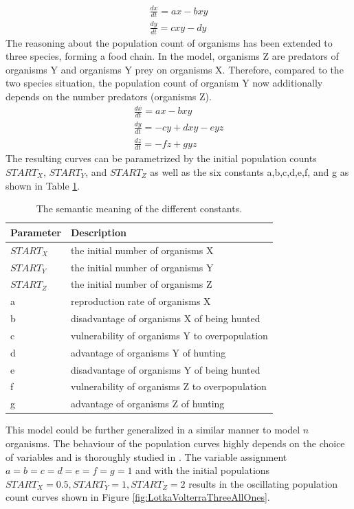 \documentclass[11pt]{article}
\begin{document}
\begin{equation}
\begin{split}
\frac{dx}{dt} = ax-bxy \\ 
\frac{dy}{dt} = cxy-dy
\end{split}
\end{equation}
The reasoning about the population count of organisms has been extended to three species, \cite{lotkaVolterraThreeSpecies} forming a food chain. In the model, organisms Z are predators of organisms Y and organisms Y prey on organisms X. Therefore, compared to the two species situation, the population count of organism Y now additionally depends on the number predators (organisms Z).
\begin{equation}
\begin{split}
\frac{dx}{dt} = ax-bxy \\ 
\frac{dy}{dt} = -cy+dxy-eyz \\ 
\frac{dz}{dt} = -fz+gyz
\end{split}
\end{equation}
The resulting curves can be parametrized by the initial population counts $START_X$, $START_Y$, and $START_Z$ as well as the six constants a,b,c,d,e,f, and g as shown in Table \ref{tab:LotkaVolterraParameters}.
\begin{table}[htbp]
\centering
\begin{tabular}{l|l}
Parameter & Description \\ 
\hline 
\hline 
$START_X$ & the initial number of organisms X\\
\hline
$START_Y$ & the initial number of organisms Y\\
\hline
$START_Z$ & the initial number of organisms Z\\
\hline
a & reproduction rate of organisms X\\ 
\hline 
b & disadvantage of organisms X of being hunted\\ 
\hline 
c & vulnerability of organisms Y to overpopulation\\  
\hline 
d & advantage of organisms Y of hunting\\
\hline 
e & disadvantage of organisms Y of being hunted\\
\hline 
f & vulnerability of organisms Z to overpopulation\\
\hline 
g & advantage of organisms Z of hunting\\
\end{tabular}
\caption{The semantic meaning of the different constants.}
\label{tab:LotkaVolterraParameters}
\end{table}
This model could be further generalized in a similar manner to model $n$ organisms. The behaviour of the population curves highly depends on the choice of variables and is thoroughly studied in \cite{lotkaVolterraThreeSpecies}. The variable assignment $a=b=c=d=e=f=g=1$ and with the initial populations $START_X= 0.5,START_Y = 1, START_Z=2$ results in the oscillating population count curves shown in Figure \ref{fig:LotkaVolterraThreeAllOnes}. 
\end{document}
